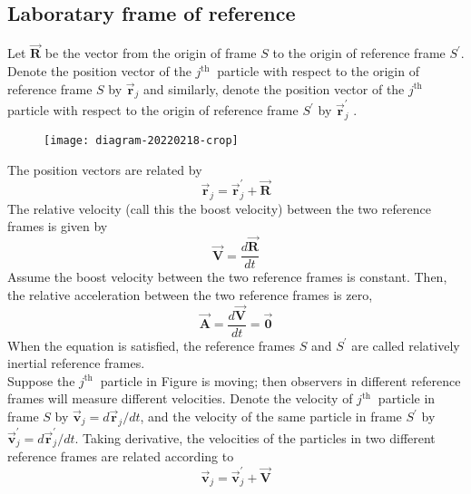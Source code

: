 \subsection{Laboratary frame of reference}
 Let $\overrightarrow{\mathbf{R}}$ be the vector from the origin of frame $S$ to the origin of reference frame $S^{\prime}$. Denote the position vector of the $j^{\text {th }}$ particle with respect to the origin of reference frame $S$ by $\overrightarrow{\mathbf{r}}_{j}$ and similarly, denote the position vector of the $j^{\text {th }}$ particle with respect to the origin of reference frame $S^{\prime}$ by $\overrightarrow{\mathbf{r}}_{j}^{\prime}$ .\\
 \begin{figure}[H]
 	\centering
 	\texttt{[image: diagram-20220218-crop]}
 	\caption{}
 	\label{}
 \end{figure}
The position vectors are related by
$$
\overrightarrow{\mathbf{r}}_{j}=\overrightarrow{\mathbf{r}}_{j}^{\prime}+\overrightarrow{\mathbf{R}}
$$
The relative velocity (call this the boost velocity) between the two reference frames is given by
$$
\overrightarrow{\mathbf{V}}=\frac{d \overrightarrow{\mathbf{R}}}{d t}
$$
Assume the boost velocity between the two reference frames is constant. Then, the relative acceleration between the two reference frames is zero,
$$
\overrightarrow{\mathbf{A}}=\frac{d \overrightarrow{\mathbf{V}}}{d t}=\overrightarrow{\mathbf{0}}
$$
When the equation is satisfied, the reference frames $S$ and $S^{\prime}$ are called relatively inertial reference frames.\\
Suppose the $j^{\text {th }}$ particle in Figure is moving; then observers in different reference frames will measure different velocities. Denote the velocity of $j^{\text {th }}$ particle in frame $S$ by $\overrightarrow{\mathbf{v}}_{j}=d \overrightarrow{\mathbf{r}}_{j} / d t$, and the velocity of the same particle in frame $S^{\prime}$ by $\overrightarrow{\mathbf{v}}_{j}^{\prime}=d \overrightarrow{\mathbf{r}}_{j}^{\prime} / d t$. Taking derivative, the velocities of the particles in two different reference frames are related according to
$$
\overrightarrow{\mathbf{v}}_{j}=\overrightarrow{\mathbf{v}}_{j}^{\prime}+\overrightarrow{\mathbf{V}}
$$
